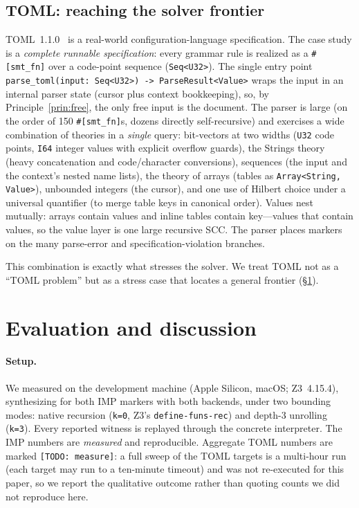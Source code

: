 \documentclass[11pt,a4paper]{article}
\theoremstyle{definition}
\theoremstyle{remark}
\newcommand{\imp}{IMP}
\newcommand{\toml}{TOML}
\newcommand{\code}[1]{\texttt{#1}}
\begin{document}
\subsection{\toml{}: reaching the solver frontier}
\label{sec:tomlcase}

\toml{}~1.1.0~\cite{tomlspec} is a real-world configuration-language
specification. The case study
is a \emph{complete runnable specification}: every grammar rule is realized as a
\code{\#[smt\_fn]} over a code-point sequence (\code{Seq<U32>}). The single entry
point \code{parse\_toml(input: Seq<U32>) -> ParseResult<Value>} wraps the input
in an internal parser state (cursor plus context bookkeeping), so, by
Principle~\ref{prin:free}, the only free input is the document. The parser is
large (on the order of 150 \code{\#[smt\_fn]}s, dozens directly self-recursive)
and exercises a wide combination of theories in a \emph{single} query:
bit-vectors at two widths (\code{U32} code points, \code{I64} integer values with
explicit overflow guards), the Strings theory (heavy concatenation and
code/character conversions), sequences (the input and the context's
nested name lists), the theory of arrays (tables as \code{Array<String, Value>}),
unbounded integers (the cursor), and one use of Hilbert choice under a universal
quantifier (to merge table keys in canonical order). Values nest mutually:
arrays contain values and inline tables contain key---values that contain values,
so the value layer is one large recursive SCC. The parser places markers on the
many parse-error and specification-violation branches.

This combination is exactly what stresses the solver. We treat \toml{} not as a
``\toml{} problem'' but as a stress case that locates a general frontier
(\S\ref{sec:eval}).

\section{Evaluation and discussion}
\label{sec:eval}

\paragraph{Setup.}
We measured on the development machine (Apple Silicon, macOS; Z3~4.15.4),
synthesizing for both \imp{} markers with both backends, under two bounding
modes: native recursion (\code{k=0}, Z3's \code{define-funs-rec}) and depth-3
unrolling (\code{k=3}). Every reported witness is replayed through the concrete
interpreter. The \imp{} numbers are \emph{measured} and reproducible. Aggregate
\toml{} numbers are marked \code{[TODO: measure]}: a full sweep of the \toml{}
targets is a multi-hour run (each target may run to a ten-minute timeout) and was
not re-executed for this paper, so we report the qualitative outcome rather than
quoting counts we did not reproduce here.
\end{document}
